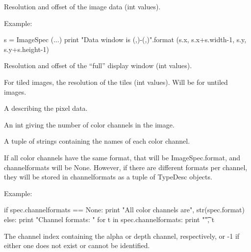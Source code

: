 Resolution and offset of the image data ({\cf int} values).

\noindent Example:
\begin{code}
    s = ImageSpec (...)
    print "Data window is ({},{})-({},{})".format (s.x, s.x+s.width-1,
                                                   s.y, s.y+s.height-1)
\end{code}
\apiend

Resolution and offset of the ``full'' display window ({\cf int} values).
\apiend

For tiled images, the resolution of the tiles ({\cf int} values).  Will be
{} for  untiled images.
\apiend

A \TypeDesc describing the pixel data.
\apiend

An {\cf int} giving the number of color channels in the image.
\apiend

A tuple of strings containing the names of each color channel.
\apiend

If all color channels have the same format, that will be {\cf ImageSpec.format},
and {\cf channelformats} will be {\cf None}.  However, if there are different
formats per channel, they will be stored in {\cf channelformats} as a tuple
of {\cf TypeDesc} objects.

\noindent Example:
\begin{code}
    if spec.channelformats == None:
        print "All color channels are", str(spec.format)
    else:
        print "Channel formats: "
        for t in spec.channelformats:
            print "\t", t
\end{code}
\apiend

The channel index containing the alpha or depth channel, respectively, or
-1 if either one does not exist or cannot be identified.
\apiend

